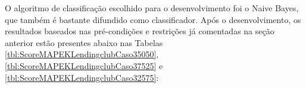 \documentclass[portugues]{ic-tese}
\begin{document}
O algoritmo de classificação escolhido para o desenvolvimento foi o Naive Bayes\citep{Naive_Bayes_2004}, que também é bastante difundido como classificador. Após o desenvolvimento, os resultados baseados nas pré-condições e restrições já comentadas na seção anterior estão presentes abaixo nas Tabelas \ref{tbl:ScoreMAPEKLendingclubCaso35050}, \ref{tbl:ScoreMAPEKLendingclubCaso37525} e \ref{tbl:ScoreMAPEKLendingclubCaso32575}:

\begin{table}[H]
\begin{center}
  \caption{Melhores opções escolhidas pelo modelo MAPE-K \\ Todos os métodos - 50\% Performance/50\% Fairness}
\label{tbl:ScoreMAPEKLendingclubCaso35050}
\end{center}
\end{table}
\end{document}
